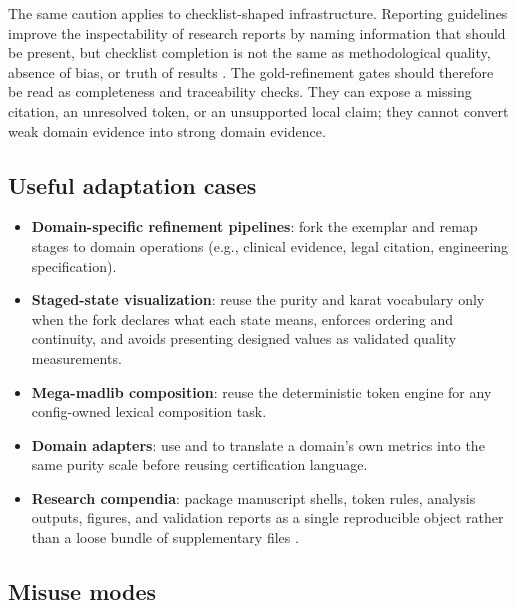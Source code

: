 \documentclass[
  english,
]{article}
\providecommand{\tightlist}{%
  \setlength{\itemsep}{0pt}\setlength{\parskip}{0pt}}
\begin{document}
The same caution applies to checklist-shaped infrastructure. Reporting
guidelines improve the inspectability of research reports by naming
information that should be present, but checklist completion is not the
same as methodological quality, absence of bias, or truth of results
\citep{equator_network_reporting_guidelines, schulz2010consort, page2021prisma}.
The gold-refinement gates should therefore be read as completeness and
traceability checks. They can expose a missing citation, an unresolved
token, or an unsupported local claim; they cannot convert weak domain
evidence into strong domain evidence.

\subsection{Useful adaptation cases}\label{useful-adaptation-cases}

\begin{itemize}
\tightlist
\item
  \textbf{Domain-specific refinement pipelines}: fork the exemplar and
  remap stages to domain operations (e.g., clinical evidence, legal
  citation, engineering specification).
\item
  \textbf{Staged-state visualization}: reuse the purity and karat
  vocabulary only when the fork declares what each state means, enforces
  ordering and continuity, and avoids presenting designed values as
  validated quality measurements.
\item
  \textbf{Mega-madlib composition}: reuse the deterministic token engine
  for any config-owned lexical composition task.
\item
  \textbf{Domain adapters}: use  and
   to translate a domain's own metrics into
  the same purity scale before reusing certification language.
\item
  \textbf{Research compendia}: package manuscript shells, token rules,
  analysis outputs, figures, and validation reports as a single
  reproducible object rather than a loose bundle of supplementary files
  \citep{marwick2018packaging}.
\end{itemize}

\subsection{Misuse modes}\label{misuse-modes}
\end{document}
